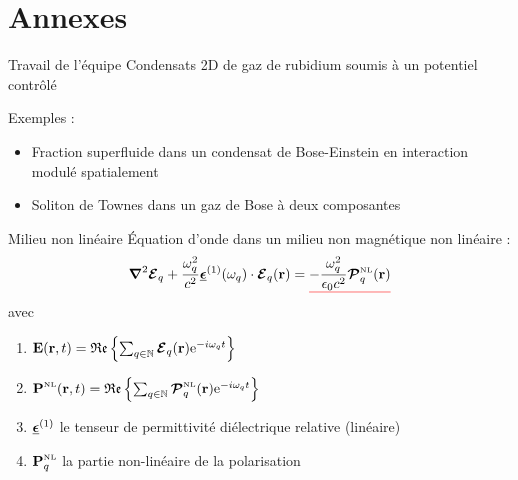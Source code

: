 \documentclass{beamer}
\begin{document}
\appendix

\section{Annexes}

\begin{frame}{Travail de l'équipe}
Condensats 2D de gaz de rubidium soumis à un potentiel contrôlé

Exemples :
\begin{itemize}
\item Fraction superfluide dans un condensat de Bose-Einstein en interaction modulé spatialement
\item Soliton de Townes dans un gaz de Bose à deux composantes
\end{itemize}
\end{frame}

\begin{frame}{Milieu non linéaire}
Équation d'onde dans un milieu non magnétique non linéaire :
\begin{equation*}
\boldsymbol{\nabla}^2 \boldsymbol{\E}_q + \frac{\omega_q^2}{c^2}\tens\epsilon^{(1)}(\omega_q)\cdot \v \E_q(\v r) = \uline{red}{ - \frac{\omega_q^2}{\epsilon_0 c^2} \boldsymbol{\mathcal{P}}^\mathsc{NL}_q(\v r) }
\end{equation*}
avec
\begin{enumerate}
\item[ ] $\v E(\v r, t) = \mathfrak{Re} \left\{ \sum_{q \in \mathbb N} \v {\boldsymbol{\mathcal E}}_q (\v r) \e{-i \omega_q t} \right\}$
\item[ ] $\v P^\mathsc{NL} (\v r, t) = \mathfrak{Re} \left\{ \sum_{q \in \mathbb N} \v {\boldsymbol{\mathcal P}}^\mathsc{NL}_q (\v r) \e{-i \omega_q t} \right\}$
\item[ ] $\tens \epsilon^{(1)}$ le tenseur de permittivité diélectrique relative (linéaire)
\item[ ] $\v P^\mathsc{NL}_q$ la partie non-linéaire de la polarisation
\end{enumerate}
\end{frame}
\end{document}

